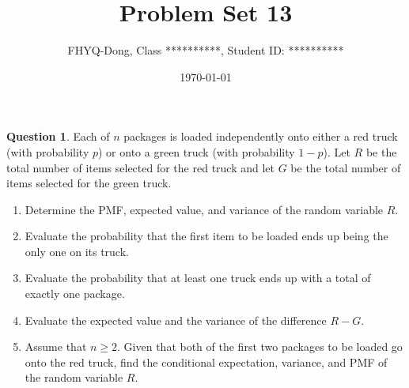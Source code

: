 \documentclass[utf8]{article}
\title{Problem Set 13}
\author{ FHYQ-Dong, Class **********, Student ID: ********** }
\date{\today}
\theoremstyle{definition}%
\newtheorem{question}{Question} %
\theoremstyle{plain}%
\begin{document}
\maketitle
\thispagestyle{fancy}

\begin{question}
    Each of $n$ packages is loaded independently onto either a red truck (with probability $p$) or onto a green truck (with probability $1 - p$). Let $R$ be the total number of items selected for the red truck and let $G$ be the total number of items selected for the green truck.
    \begin{enumerate}[label=(\alph*)]
        \item Determine the PMF, expected value, and variance of the random variable $R$.
        \item Evaluate the probability that the first item to be loaded ends up being the only one on its truck.
        \item Evaluate the probability that at least one truck ends up with a total of exactly one package.
        \item Evaluate the expected value and the variance of the difference $R - G$.
        \item Assume that $n \geq 2$. Given that both of the first two packages to be loaded go onto the red truck, find the conditional expectation, variance, and PMF of the random variable $R$.
    \end{enumerate}
\end{question}
\end{document}
